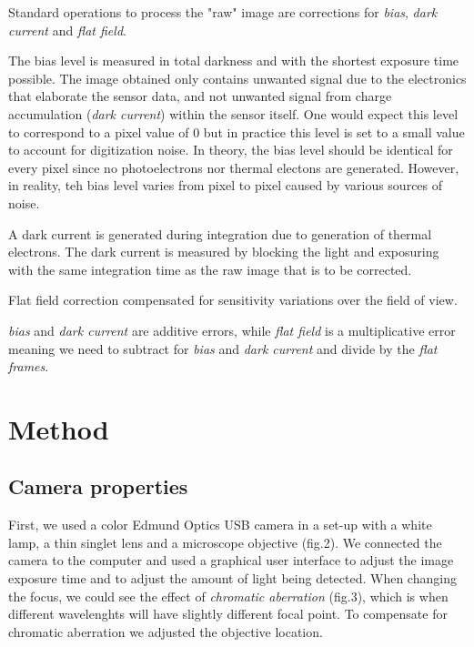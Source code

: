 \documentclass{emulateapj}
\begin{document}
  Standard operations to process the "raw" image are corrections for \textit{bias}, \textit{dark current} and \textit{flat field}. 

  The bias level is measured in total darkness and with the shortest exposure time possible. The image obtained only contains unwanted signal due to the electronics that elaborate the sensor data, and not unwanted signal from charge accumulation (\textit{dark current}) within the sensor itself. One would expect this level to correspond to a pixel value of 0 but in practice this level is set to a small value to account for digitization noise. In theory, the bias level should be identical for every pixel since no photoelectrons nor thermal electons are generated. However, in reality, teh bias level varies from pixel to pixel caused by various sources of noise.

  A dark current is generated during integration due to generation of thermal electrons. The dark current is measured by blocking the light and exposuring with the same integration time as the raw image that is to be corrected.

  Flat field correction compensated for sensitivity variations over the field of view. 

  \textit{bias} and \textit{dark current} are additive errors, while \textit{flat field} is a multiplicative error meaning we need to subtract for \textit{bias} and \textit{dark current} and divide by the \textit{flat frames}.






\section{Method}
\label{sec:method}

\subsection{Camera properties}

First, we used a color Edmund Optics USB camera in a set-up with a white lamp, a thin singlet lens and a microscope objective (fig.2). We connected the camera to the computer and used a graphical user interface to adjust the image exposure time and to adjust the amount of light being detected. When changing the focus, we could see the effect of \textit{chromatic aberration} (fig.3), which is when different wavelenghts will have slightly different focal point. To compensate for chromatic aberration we adjusted the objective location.
\end{document}
